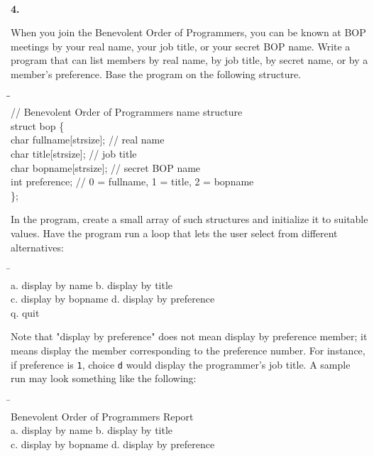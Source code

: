 \documentclass[10 pt]{amsart}
\newlength{\cwidth}
\newenvironment{cpart}[2][\cwidth]
	{\\ \phantom{\qquad}\textbf{#2. }\begin{minipage}[t]{#1}}
	{\end{minipage}}
\newcommand{\ttt}[1]{\texttt{#1}}
\begin{document}
	\begin{cpart}{4}
		When you join the Benevolent Order of Programmers, you can
		be known at BOP meetings by your real name, your job title, 
		or your secret BOP name.
		Write a program that can list members by real name, by job
		title, by secret name, or by a member's preference.
		Base the program on the following structure.
		{\ttfamily
			\begin{tabbing}
				\phantom{\qquad}\=\hspace{5 cm}\=\phantom{\qquad}\= \\
				// Benevolent Order of Programmers name structure \\
				struct bop \{ \\
				\> 	char fullname[strsize]; \> // real name \\
				\>		char title[strsize]; \> // job title \\
				\> 	char bopname[strsize]; \> // secret BOP name \\
				\> 	int preference; \> 		
					// 0 = fullname, 1 = title, 2 = bopname \\
				\};
			\end{tabbing}
		}
		In the program, create a small array of such structures and
		initialize it to suitable values.
		Have the program run a loop that lets the user select from
		different alternatives:
		{\ttfamily
			\begin{tabbing}
				\hspace{5 cm}\=\phantom{\qquad}\= \\
				a. display by name \> b. display by title \\
				c. display by bopname \> d. display by preference \\
				q. quit
			\end{tabbing}
		}
		Note that "display by preference" does not mean display by
		preference member;
		it means display the member corresponding to the preference 
		number.
		For instance, if preference is \ttt{1}, choice \ttt{d}
		would display the programmer's job title. 
		A sample run may look something like the following:
		{\ttfamily
			\begin{tabbing}
				\hspace{5 cm}\=\phantom{\qquad}\= \\
				Benevolent Order of Programmers Report \\
				a. display by name \> b. display by title \\
				c. display by bopname \> d. display by preference \\

\end{tabbing}}
\end{cpart}
\end{document}

